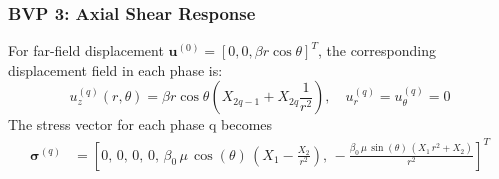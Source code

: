 \documentclass[oneside, 12pt, a4paper, bibliography=totoc]{book}
\newcommand{\bs}[1]{\bm{#1}}                       %
\begin{document}
\subsubsection{BVP 3: Axial Shear Response}

For far-field displacement $\bs{u}^{(0)} = [0, 0, \beta r \cos\theta]^T$, the corresponding displacement field in each phase is:
%
\begin{equation}
    u_z^{(q)}(r, \theta) = \beta r \cos\theta \left(X_{2q-1} + X_{2q} \frac{1}{r^2}\right), \quad u_r^{(q)} = u_\theta^{(q)} = 0
    \label{eq:uz_axial}
\end{equation}
The stress vector for each phase q becomes
\begin{align}
\bs{\sigma}^{(q)} 
&=[0, \, 0, \, 0, \, 0,\,\beta_0 \,\mu \,\cos \left(\theta \right)\,{\left(X_1 -\frac{X_2 }{r^2 }\right)},\,-\frac{\beta_0 \,\mu \,\sin \left(\theta \right)\,{\left(X_1 \,r^2 +X_2 \right)}}{r^2 }
]^T
\end{align}
\end{document}
